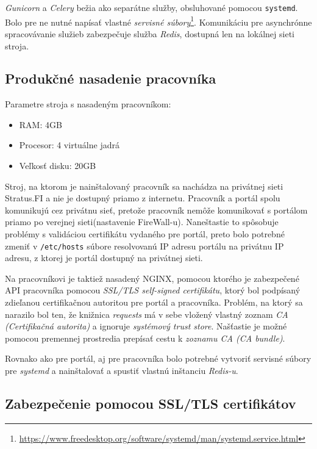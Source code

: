 \documentclass[
  digital, %
  twoside, %
  table,   %
  lof,     %
  lot,     %
]{fithesis3}
\begin{document}
\emph{Gunicorn} a \emph{Celery} bežia ako separátne služby, obsluhované pomocou \texttt{systemd}. Bolo pre ne nutné napísať vlastné \emph{servisné súbory}\footnote{\url{https://www.freedesktop.org/software/systemd/man/systemd.service.html}}. Komunikáciu pre asynchrónne spracovávanie služieb zabezpečuje služba \emph{Redis}, dostupná len na lokálnej sieti stroja.

\subsection{Produkčné nasadenie pracovníka}

Parametre stroja s nasadeným pracovníkom:
\begin{itemize}
    \item RAM: 4GB
    \item Procesor: 4 virtuálne jadrá
    \item Veľkosť disku: 20GB
\end{itemize}

Stroj, na ktorom je nainštalovaný pracovník sa nachádza na privátnej sieti Stratus.FI a nie je dostupný priamo z internetu. Pracovník a portál spolu komunikujú cez privátnu sieť, pretože pracovník nemôže komunikovať s portálom priamo po verejnej sieti(nastavenie FireWall-u). Naneštastie to spôsobuje problémy s validáciou certifikátu vydaného pre portál, preto bolo potrebné zmeniť v \texttt{/etc/hosts} súbore resolvovanú IP adresu portálu na privátnu IP adresu, z ktorej je portál dostupný na privátnej sieti.

Na pracovníkovi je taktiež nasadený NGINX, pomocou ktorého je zabezpečené API pracovníka pomocou \emph{SSL/TLS self-signed certifikátu}, ktorý bol podpísaný zdieľanou certifikačnou autoritou pre portál a pracovníka. Problém, na ktorý sa narazilo bol ten, že knižnica \emph{requests} má v sebe vložený vlastný zoznam \emph{CA (Certifikačná autorita)}\cite{RFC5280} a ignoruje \emph{systémový trust store}. Našťastie je možné pomocou premennej prostredia prepísať cestu k \emph{zoznamu CA (CA bundle)}.

Rovnako ako pre portál, aj pre pracovníka bolo potrebné vytvoriť servisné súbory pre \emph{systemd} a nainštalovať a spustiť vlastnú inštanciu \emph{Redis-u}.


\subsection{Zabezpečenie pomocou SSL/TLS certifikátov}
\end{document}
